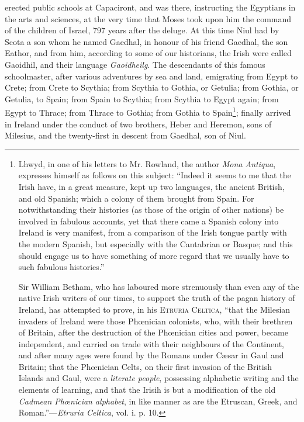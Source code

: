 \documentclass[11pt,oneside]{memoir}
\begin{document}
erected public schools at Capaciront, and was there, instructing the Egyptians in the arts and sciences, at the very time that Moses took upon him the command of the children of Israel, 797 years after the deluge.
At this time Niul had by Scota a son whom he named Gaedhal, in honour of his friend Gaedhal, the son Eathor, and from him, according to some of our historians, the Irish were called Gaoidhil, and their language \textit{Gaoidheilg}.
The descendants of this famous schoolmaster, after various adventures by sea and land, emigrating from Egypt to Crete; from Crete to Scythia; from Scythia to Gothia, or Getulia; from Gothia, or Getulia, to Spain; from Spain to Scythia; from Scythia to Egypt again; from Egypt to Thrace; from Thrace to Gothia; from Gothia to Spain\footnote{
    Lhwyd, in one of his letters to Mr. Rowland, the author \textit{Mona Antiqua}, expresses himself as follows on this subject:
    ``Indeed it seems to me that the Irish have, in a great measure, kept up two languages, the ancient British, and old Spanish; which a colony of them brought from Spain.
    For notwithstanding their histories (as those of the origin of other nations) be involved in fabulous accounts, yet that there came a Spanish colony into Ireland is very manifest, from a comparison of the Irish tongue partly with the modern Spanish, but especially with the Cantabrian or Basque;
    and this should engage us to have something of more regard that we usually have to such fabulous histories.''

    Sir William Betham, who has laboured more strenuously than even any of the native Irish writers of our times, to support the truth of the pagan history of Ireland, has attempted to prove, in his \textsc{Etruria Celtica}, ``that the Milesian invaders of Ireland were those Phœnician colonists, who, with their brethren of Britain, after the destruction of the Phœnician cities and power, became independent, and carried on trade with their neighbours of the Continent, and after many ages were found by the Romans under C{\ae}sar in Gaul and Britain;
    that the Ph{\oe}nician Celts, on their first invasion of the British Islands and Gaul, were a \textit{literate people}, possessing alphabetic writing and the elements of learning, and that the Irisih is but a modification of the old \textit{Cadmean Ph{\oe}nician alphabet}, in like manner as are the Etruscan, Greek, and Roman.''---\textit{Etruria Celtica}, vol. i. p. 10.
};
finally arrived in Ireland under the conduct of two brothers,  Heber and Heremon, sons of Milesius, and the twenty-first in descent from Gaedhal, son of Niul.
\end{document}
